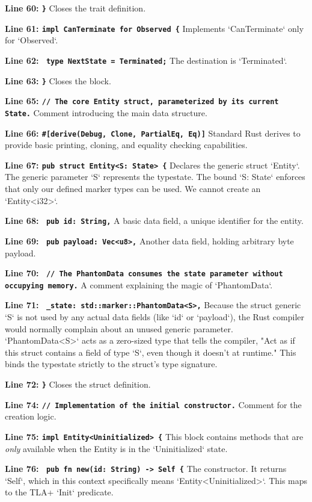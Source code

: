 \textbf{Line 60: \texttt{\}}}
Closes the trait definition.

\textbf{Line 61: \texttt{impl CanTerminate for Observed \{}}
Implements `CanTerminate` only for `Observed`.

\textbf{Line 62: \texttt{    type NextState = Terminated;}}
The destination is `Terminated`.

\textbf{Line 63: \texttt{\}}}
Closes the block.

\textbf{Line 65: \texttt{// The core Entity struct, parameterized by its current State.}}
Comment introducing the main data structure.

\textbf{Line 66: \texttt{\#[derive(Debug, Clone, PartialEq, Eq)]}}
Standard Rust derives to provide basic printing, cloning, and equality checking capabilities.

\textbf{Line 67: \texttt{pub struct Entity<S: State> \{}}
Declares the generic struct `Entity`. The generic parameter `S` represents the typestate. The bound `S: State` enforces that only our defined marker types can be used. We cannot create an `Entity<i32>`.

\textbf{Line 68: \texttt{    pub id: String,}}
A basic data field, a unique identifier for the entity.

\textbf{Line 69: \texttt{    pub payload: Vec<u8>,}}
Another data field, holding arbitrary byte payload.

\textbf{Line 70: \texttt{    // The PhantomData consumes the state parameter without occupying memory.}}
A comment explaining the magic of `PhantomData`.

\textbf{Line 71: \texttt{    \_state: std::marker::PhantomData<S>,}}
Because the struct generic `S` is not used by any actual data fields (like `id` or `payload`), the Rust compiler would normally complain about an unused generic parameter. `PhantomData<S>` acts as a zero-sized type that tells the compiler, "Act as if this struct contains a field of type `S`, even though it doesn't at runtime." This binds the typestate strictly to the struct's type signature.

\textbf{Line 72: \texttt{\}}}
Closes the struct definition.

\textbf{Line 74: \texttt{// Implementation of the initial constructor.}}
Comment for the creation logic.

\textbf{Line 75: \texttt{impl Entity<Uninitialized> \{}}
This block contains methods that are \textit{only} available when the Entity is in the `Uninitialized` state.

\textbf{Line 76: \texttt{    pub fn new(id: String) -> Self \{}}
The constructor. It returns `Self`, which in this context specifically means `Entity<Uninitialized>`. This maps to the TLA+ `Init` predicate.

